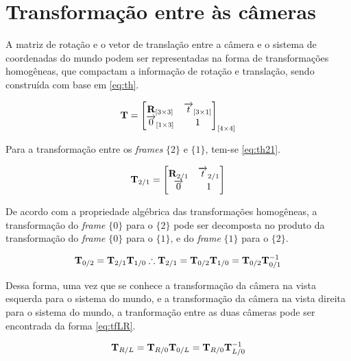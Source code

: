 \section{Transformação entre às câmeras}

A matriz de rotação e o vetor de translação entre a câmera e o sistema de coordenadas do mundo podem ser representadas na forma de transformações homogêneas, que compactam a informação de rotação e translação, sendo construída com base em \eqref{eq:th}.

\begin{equation}
	\mathbf{T} = \begin{bmatrix}
		\mathbf{R}_{[3\times 3]} & \overrightarrow{t}_{[3\times 1]} \\
		\overrightarrow{0}_{[1\times 3]} & 1
	\end{bmatrix}_{[4\times 4]}
	\label{eq:th}
\end{equation}

Para a transformação entre os \textit{frames} $\{2\}$ e $\{1\}$, tem-se \eqref{eq:th21}.

\begin{equation}
\mathbf{T}_{2/1} = \begin{bmatrix}
	\mathbf{R}_{2/1} & \overrightarrow{t}_{2/1} \\
	\overrightarrow{0} & 1
\end{bmatrix}
\label{eq:th21}
\end{equation}

De acordo com a propriedade algébrica das transformações homogêneas, a transformação do \textit{frame} $\{0\}$ para o $\{2\}$ pode ser decomposta no produto da transformação do \textit{frame} $\{0\}$ para o $\{1\}$, e do   \textit{frame} $\{1\}$ para o $\{2\}$.

\begin{equation}
	\mathbf{T}_{0/2} = \mathbf{T}_{2/1} \mathbf{T}_{1/0} \therefore \mathbf{T}_{2/1} = \mathbf{T}_{0/2} \mathbf{T}_{1/0} = \mathbf{T}_{0/2} \mathbf{T}^{-1}_{0/1}
\end{equation}

Dessa forma, uma vez que se conhece a transformação da câmera na vista esquerda para o sistema do mundo, e a transformação da câmera na vista direita para o sistema do mundo, a tranformação entre as duas câmeras pode ser encontrada da forma \eqref{eq:tfLR}.

\begin{equation}
	\mathbf{T}_{R/L} = \mathbf{T}_{R/0}\mathbf{T}_{0/L} =  \mathbf{T}_{R/0}\mathbf{T}_{L/0}^{-1}
	\label{eq:tfLR}
\end{equation}




